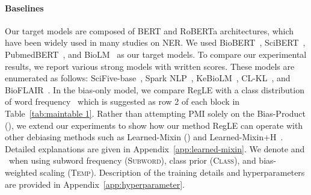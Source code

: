 \documentclass[11pt]{article}
\newcommand{\cmark}{\ding{51}}\newcommand{\xmark}{\ding{55}}\newcommand{\cross}{\ding{61}}\newcommand{\mb}[1]{\textcolor{red}{#1}}
\begin{document}
\paragraph{Baselines}
Our target models are composed of BERT and RoBERTa architectures, which have been widely used in many studies on NER.
We used BioBERT~\cite{lee2020biobert}, SciBERT~\cite{beltagy2019scibert}, PubmedBERT~\cite{liu2020domain}, and BioLM~\cite{lewis2020pretrained} as our target models. 
To compare our experimental results, we report various strong models with written scores.
These models are enumerated as follows: SciFive-base~\cite{phan2021scifive}, Spark NLP~\cite{kocaman2021spark}, KeBioLM~\cite{yuan2021improving}, CL-KL~\cite{wang2021improving}, and  BioFLAIR~\cite{sharma2019bioflair}.
In the bias-only model, we compare RegLE with a class distribution of word frequency~\cite{kim2021your} which is suggested as row 2 of each block in Table~\ref{tab:maintable 1}.
Rather than attempting PMI solely on the Bias-Product (), we extend our experiments to show how our method RegLE can operate with other debiasing methods such as Learned-Mixin () and Learned-Mixin+H~\cite{clark2019don}. 
Detailed explanations are given in Appendix~\ref{app:learned-mixin}.
We denote \cmark and \xmark ~when using subword frequency (\textsc{Subword}), class prior (\textsc{Class}), and bias-weighted scaling (\textsc{Temp}).
Description of the training details and hyperparameters are provided in Appendix~\ref{app:hyperparameter}.
\end{document}
